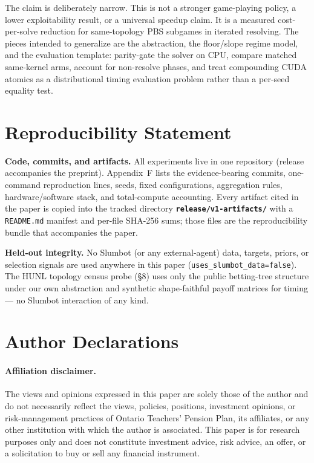 \documentclass[11pt]{article}
\begin{document}
The claim is deliberately narrow. This is not a stronger game-playing policy, a lower
exploitability result, or a universal speedup claim. It is a measured cost-per-solve
reduction for same-topology PBS subgames in iterated resolving. The pieces intended to
generalize are the abstraction, the floor/slope regime model, and the evaluation
template: parity-gate the solver on CPU, compare matched same-kernel arms, account for
non-resolve phases, and treat compounding CUDA atomics as a distributional timing
evaluation problem rather than a per-seed equality test.

\section*{Reproducibility Statement}

\textbf{Code, commits, and artifacts.} All experiments live in one repository (release
accompanies the preprint). Appendix~F lists the evidence-bearing commits, one-command
reproduction lines, seeds, fixed configurations, aggregation rules, hardware/software
stack, and total-compute accounting. Every artifact cited in the paper is copied into
the tracked directory \textbf{\texttt{release/v1-artifacts/}} with a
\texttt{README.md} manifest and per-file SHA-256 sums; those files are the
reproducibility bundle that accompanies the paper.

\textbf{Held-out integrity.} No Slumbot (or any external-agent) data, targets, priors,
or selection signals are used anywhere in this paper
(\texttt{uses\_slumbot\_data=false}). The HUNL topology census probe (\S8) uses only the
public betting-tree structure under our own abstraction and synthetic shape-faithful
payoff matrices for timing --- no Slumbot interaction of any kind.

\section*{Author Declarations}

\paragraph{Affiliation disclaimer.}
The views and opinions expressed in this paper are solely those of the author and do not
necessarily reflect the views, policies, positions, investment opinions, or
risk-management practices of Ontario Teachers' Pension Plan, its affiliates, or any
other institution with which the author is associated. This paper is for research
purposes only and does not constitute investment advice, risk advice, an offer, or a
solicitation to buy or sell any financial instrument.
\end{document}
